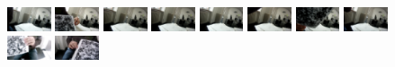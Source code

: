 \documentclass{report}
\begin{document}
\begin{figure}
\centering
\includegraphics[width=0.115\textwidth]{images/sampleimage/9-2} 
\includegraphics[width=0.115\textwidth]{images/sampleimage/32-2} 
\includegraphics[width=0.115\textwidth]{images/sampleimage/48-2} 
\includegraphics[width=0.115\textwidth]{images/sampleimage/67-2} 
\includegraphics[width=0.115\textwidth]{images/sampleimage/125-2} 
\includegraphics[width=0.115\textwidth]{images/sampleimage/155-2} 
\includegraphics[width=0.115\textwidth]{images/sampleimage/197-2} 
\includegraphics[width=0.115\textwidth]{images/sampleimage/204-2} \\ \vspace{4pt}
\includegraphics[width=0.115\textwidth]{images/sampleimage/9-3.eps} 
\includegraphics[width=0.115\textwidth]{images/sampleimage/32-3} 

\end{figure}
\end{document}
